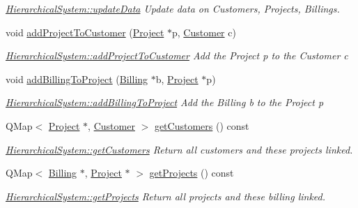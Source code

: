 \begin{DoxyCompactItemize}
\begin{DoxyCompactList}\small\item\em \hyperlink{classUtils_1_1HierarchicalSystem_af0881e95aef001ee46d9f83a9e66dca5}{Hierarchical\+System\+::update\+Data} Update data on Customers, Projects, Billings. \end{DoxyCompactList}\item 
void \hyperlink{classUtils_1_1HierarchicalSystem_a26f07f62ebb50520bc11665e26cedadc}{add\+Project\+To\+Customer} (\hyperlink{classModels_1_1Project}{Project} $\ast$p, \hyperlink{classModels_1_1Customer}{Customer} c)
\begin{DoxyCompactList}\small\item\em \hyperlink{classUtils_1_1HierarchicalSystem_a26f07f62ebb50520bc11665e26cedadc}{Hierarchical\+System\+::add\+Project\+To\+Customer} Add the Project {\itshape p} to the Customer {\itshape c} \end{DoxyCompactList}\item 
void \hyperlink{classUtils_1_1HierarchicalSystem_a4452533b6f536a92ba1a3c5fe3d8c12d}{add\+Billing\+To\+Project} (\hyperlink{classModels_1_1Billing}{Billing} $\ast$b, \hyperlink{classModels_1_1Project}{Project} $\ast$p)
\begin{DoxyCompactList}\small\item\em \hyperlink{classUtils_1_1HierarchicalSystem_a4452533b6f536a92ba1a3c5fe3d8c12d}{Hierarchical\+System\+::add\+Billing\+To\+Project} Add the Billing {\itshape b} to the Project p \end{DoxyCompactList}\item 
Q\+Map$<$ \hyperlink{classModels_1_1Project}{Project} $\ast$, \hyperlink{classModels_1_1Customer}{Customer} $>$ \hyperlink{classUtils_1_1HierarchicalSystem_aa66210b1d52960ebc9b7b1d827de8564}{get\+Customers} () const 
\begin{DoxyCompactList}\small\item\em \hyperlink{classUtils_1_1HierarchicalSystem_aa66210b1d52960ebc9b7b1d827de8564}{Hierarchical\+System\+::get\+Customers} Return all customers and these projects linked. \end{DoxyCompactList}\item 
Q\+Map$<$ \hyperlink{classModels_1_1Billing}{Billing} $\ast$, \hyperlink{classModels_1_1Project}{Project} $\ast$ $>$ \hyperlink{classUtils_1_1HierarchicalSystem_ae62e86244c20f66c4b741ad3a235e7d1}{get\+Projects} () const 
\begin{DoxyCompactList}\small\item\em \hyperlink{classUtils_1_1HierarchicalSystem_ae62e86244c20f66c4b741ad3a235e7d1}{Hierarchical\+System\+::get\+Projects} Return all projects and these billing linked. \end{DoxyCompactList}\end{DoxyCompactItemize}


